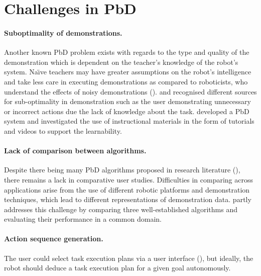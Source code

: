 \section{Challenges in PbD}\label{sssec:Challenges in PbD}

\paragraph{Suboptimality of demonstrations.}
Another known PbD problem exists with regards to the type and quality of the demonstration which is dependent on the teacher's knowledge of the robot's system.
Na\"{\i}ve teachers may have greater assumptions on the robot's intelligence and take less care in executing demonstrations as compared to roboticists, who understand the effects of noisy demonstrations (\cite{suay2012practical}).
\cite{chen2003programing} and \cite{kaiser1995obtaining} recognised different sources for sub-optimality in demonstration such as the user demonstrating unnecessary or incorrect actions due the lack of knowledge about the task.
\cite{cakmak2014teaching} developed a PbD system and investigated the use of instructional materials in the form of tutorials and videos to support the learnability.

\paragraph{Lack of comparison between algorithms.}
Despite there being many PbD algorithms proposed in research literature (\cite{argall2009survey,billing2010formalism}), there remains a lack in comparative user studies.
Difficulties in comparing across applications arise from the use of different robotic platforms and demonstration techniques, which lead to different representations of demonstration data.
\cite{suay2012practical} partly addresses this challenge by comparing three well-established algorithms and evaluating their performance in a common domain.

\paragraph{Action sequence generation.}
The user could select task execution plans via a user interface (\cite{guerin2015framework}), but ideally, the robot should deduce a task execution plan for a given goal autonomously.